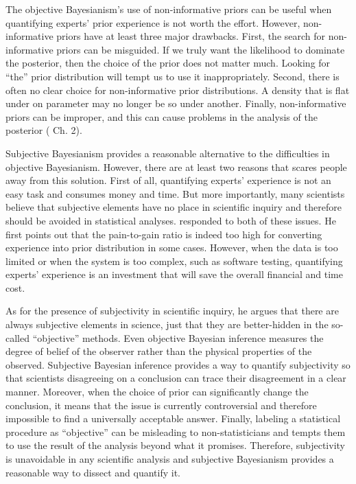 \documentclass[12pt]{article} \usepackage[nolists]{endfloat}
\begin{document}
The objective Bayesianism's use of non-informative priors can be useful when quantifying experts' prior experience is not worth the effort.
However, non-informative priors have at least three major drawbacks.
First, the search for non-informative priors can be misguided.
If we truly want the likelihood to dominate the posterior, then the choice of the prior does not matter much.
Looking for ``the'' prior distribution will tempt us to use it inappropriately.
Second, there is often no clear choice for non-informative prior distributions.
A density that is flat under on parameter may no longer be so under another.
Finally, non-informative priors can be improper, and this can cause problems in the analysis of the posterior (\cite{gelman} Ch. 2).

Subjective Bayesianism provides a reasonable alternative to the difficulties in objective Bayesianism.
However, there are at least two reasons that scares people away from this solution.
First of all, quantifying experts' experience is not an easy task and consumes money and time.
But more importantly, many scientists believe that subjective elements have no place in scientific inquiry and therefore should be avoided in statistical analyses.
\cite{goldstein} responded to both of these issues.
He first points out that the pain-to-gain ratio is indeed too high for converting experience into prior distribution in some cases.
However, when the data is too limited or when the system is too complex, such as software testing, quantifying experts' experience is an investment that will save the overall financial and time cost.

As for the presence of subjectivity in scientific inquiry, he argues that there are always subjective elements in science,
just that they are better-hidden in the so-called ``objective'' methods.
Even objective Bayesian inference measures the degree of belief of the observer rather than the physical properties of the observed.
Subjective Bayesian inference provides a way to quantify subjectivity so that scientists disagreeing on a conclusion can trace their disagreement in a clear manner.
Moreover, when the choice of prior can significantly change the conclusion,
it means that the issue is currently controversial and therefore impossible to find a universally acceptable answer.
Finally, labeling a statistical procedure as ``objective'' can be misleading to non-statisticians and tempts them to use the result of the analysis beyond what it promises.
Therefore, subjectivity is unavoidable in any scientific analysis and subjective Bayesianism provides a reasonable way to dissect and quantify it.
\end{document}
